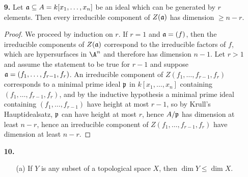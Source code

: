 \documentclass[a4paper]{article}
\begin{document}
\begin{enumerate} [label=\textbf{\arabic*.}, leftmargin=0em]
          \begin{proof}
              Let $Y = Z(\goth{p})$ and $H = Z(f)$ for some prime ideal $\goth{p}$ and irreducible polynomial $f$ in $k[x_1, \dots, x_n]$. If $Y \nsubseteq H$, then $f \notin \goth{p}$, so the image of $f$ in $A(Y) = k[x_1, \dots, x_n] / \goth{p}$ is not a zero-divisor. If $f$ is a unit in $A(Y)$, then $f$ does not vanish at any points in $Y$, which implies $Y$ and $H$ does not intersect, so $Y \cap H$ has no irreducible components (the empty set is defined to be not irreducible). Otherwise, the coordinate ring of an irreducible component of $Y \cap H$ corresponds to a minimal prime ideal $\goth{q}$ in $A(Y)$ which contains $f$. By Krull's Hauptidealsatz, any such prime ideal must have height $1$, and since $A(Y)$ has dimension $r$, it follows that $A(Y) / \goth{q}$ has dimension $r - 1$ by (1.8A).
          \end{proof}

    \item[\textbf{9.}] Let $\mathfrak{a} \subseteq A = k[x_1, \dots, x_n]$ be an ideal which can be generated by $r$ elements. Then every irreducible component of $Z(\mathfrak{a})$ has dimension $\geq n - r$.

          \begin{proof}
              We proceed by induction on $r$. If $r = 1$ and $\mathfrak{a} = (f)$, then the irreducible components of $Z(\mathfrak{a})$ correspond to the irreducible factors of $f$, which are hypersurfaces in $\A^n$ and therefore has dimension $n - 1$. Let $r > 1$ and assume the statement to be true for $r - 1$ and suppose $\mathfrak{a} = (f_1, \dots, f_{r - 1}, f_r)$. An irreducible component of $Z(f_1, \dots, f_{r - 1}, f_r)$ corresponds to a minimal prime ideal $\goth{p}$ in $k[x_1, \dots, x_n]$ containing $(f_1, \dots, f_{r - 1}, f_r)$, and by the inductive hypothesis a minimal prime ideal containing $(f_1, \dots, f_{r - 1})$ have height at most $r - 1$, so by Krull's Hauptidealsatz, $\goth{p}$ can have height at most $r$, hence $A / \mathfrak{p}$ has dimension at least $n - r$, hence an irreducible component of $Z(f_1, \dots, f_{r - 1}, f_r)$ have dimension at least $n - r$.
          \end{proof}

    \item[\textbf{10.}]
          \begin{itemize}
              \item[(a)] If $Y$ is any subset of a topological space $X$, then $\dim{Y} \leq \dim{X}$.


\end{itemize}
\end{enumerate}
\end{document}
